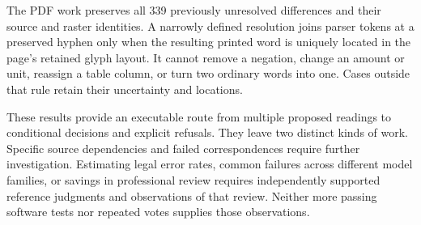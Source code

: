 The PDF work preserves all 339 previously unresolved differences and their
source and raster identities. A narrowly defined resolution joins parser
tokens at a preserved hyphen only when the resulting printed word is uniquely
located in the page's retained glyph layout. It cannot remove a negation,
change an amount or unit, reassign a table column, or turn two ordinary words
into one. Cases outside that rule retain their uncertainty and locations.

These results provide an executable route from multiple proposed readings to
conditional decisions and explicit refusals. They leave two distinct kinds of
work. Specific source dependencies and failed correspondences require further
investigation. Estimating legal error rates, common failures across different
model families, or savings in professional review requires independently
supported reference judgments and observations of that review. Neither more
passing software tests nor repeated votes supplies those observations.

